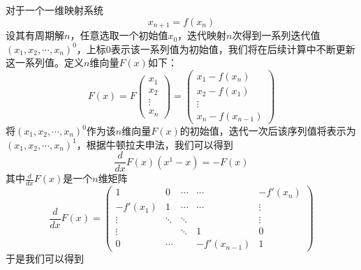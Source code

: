 对于一个一维映射系统
\begin{equation}
    x_{n+1}=f(x_n)
\end{equation}
设其有周期解$n$，任意选取一个初始值$x_0$，迭代映射$n$次得到一系列迭代值$(x_1,x_2,\cdots,x_n)^0$，上标$0$表示该一系列值为初始值，我们将在后续计算中不断更新这一系列值。定义$n$维向量$F(x)$如下：
\begin{equation}
    F(x)=F
    \begin{pmatrix}
        x_1\\
        x_2\\
        \vdots \\
        x_n
    \end{pmatrix}=
    \begin{pmatrix}
        x_1-f(x_n)\\
        x_2-f(x_1)\\
        \vdots \\
        x_n-f(x_{n-1})
    \end{pmatrix}
\end{equation}
将$(x_1,x_2,\cdots,x_n)^0$作为该$n$维向量$F(x)$的初始值，迭代一次后该序列值将表示为$(x_1,x_2,\cdots,x_n)^1$，根据牛顿拉夫申法，我们可以得到
\begin{equation}
    \dfrac{d}{dx}F(x)(x^1-x)=-F(x)
\end{equation}
其中$\frac{d}{dx}F(x)$是一个$n$维矩阵
\begin{equation}
    \dfrac{d}{dx}F(x)=
    \begin{pmatrix}
        1        & 0      & \cdots & \cdots & -f'(x_n) \\
        -f'(x_1) & 1      & \cdots & \cdots & \vdots   \\
        \vdots   & \ddots & \ddots &        & \vdots   \\
        \vdots   &        & \ddots &  1  &  0       \\
        0        & \cdots &        & -f'(x_{n-1})&1
    \end{pmatrix}
\end{equation}
于是我们可以得到
